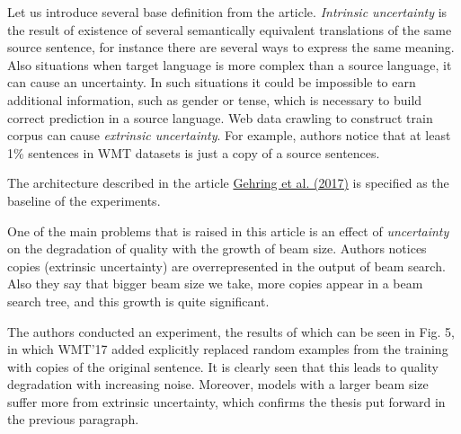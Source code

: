 \documentclass[a4paper,14pt]{extarticle}
\newcommand{\bibref}[3]{\hyperlink{#1}{#2 (#3)}}
\begin{document}
	Let us introduce several base definition from the article. \textit{Intrinsic uncertainty} is the result of existence of several semantically equivalent translations of the same source sentence, for instance there are several ways to express the same meaning. Also situations when target language is more complex than a source language, it can cause an uncertainty. In such situations it could be impossible to earn additional information, such as gender or tense, which is necessary to build correct prediction in a source language. Web data crawling to construct train corpus can cause \textit{extrinsic uncertainty}. For example, authors notice that at least 1\% sentences in WMT datasets is just a copy of a source sentences.
	
	The architecture described in the article \bibref{fconv}{Gehring et al.}{2017} is specified as the baseline of the experiments.
	
	One of the main problems that is raised in this article is an effect of \textit{uncertainty} on the degradation of quality with the growth of beam size. Authors notices copies (extrinsic uncertainty) are overrepresented in the output of beam search. Also they say that bigger beam size we take, more copies appear in a beam search tree, and this growth is quite significant.
	
	\begin{figure}[t]
	\end{figure}
	
	The authors conducted an experiment, the results of which can be seen in Fig. 5, in which WMT'17 added explicitly replaced random examples from the training with copies of the original sentence. It is clearly seen that this leads to quality degradation with increasing noise. Moreover, models with a larger beam size suffer more from extrinsic uncertainty, which confirms the thesis put forward in the previous paragraph.
	
\end{document}
